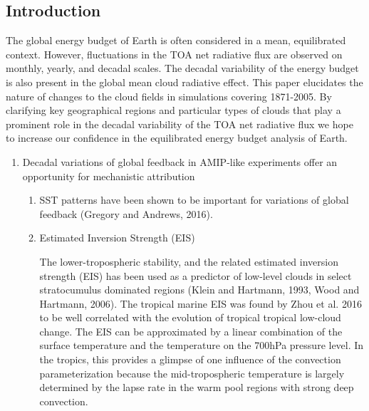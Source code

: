 \documentclass[grl]{agutex2015}
\begin{document}
\begin{article}

%
%

\section{Introduction}

The global energy budget of Earth is often considered in a mean, equilibrated context.  However, fluctuations in the TOA net radiative flux are observed on monthly, yearly, and decadal scales.  The decadal variability of the energy budget is also present in the global mean cloud radiative effect.  This paper elucidates the nature of changes to the cloud fields in simulations covering 1871-2005.  By clarifying key geographical regions and particular types of clouds that play a prominent role in the decadal variability of the TOA net radiative flux we hope to increase our confidence in the equilibrated energy budget analysis of Earth.    

    \begin{enumerate}
        \item Decadal variations of global feedback in AMIP-like experiments offer an opportunity for 
        mechanistic attribution
        	\begin{enumerate}
	    \item SST patterns have been shown to be important for variations of global 
	    feedback (Gregory and Andrews, 2016).  
	    \item Estimated Inversion Strength (EIS)
	    
	    The lower-tropospheric stability, and the related estimated inversion strength (EIS) has been used as a predictor of low-level clouds in select stratocumulus dominated regions (Klein and Hartmann, 1993, Wood and Hartmann, 2006).  The tropical marine EIS was found by Zhou et al. 2016 to be well correlated with the evolution of tropical tropical low-cloud change.  The EIS can be approximated by a linear combination of the surface temperature and the temperature on the 700hPa pressure level.  In the tropics, this provides a glimpse of one influence of the convection parameterization because the mid-tropospheric temperature is largely determined by the lapse rate in the warm pool regions with strong deep convection.
	    

\end{enumerate}
\end{enumerate}
\end{article}
\end{document}

